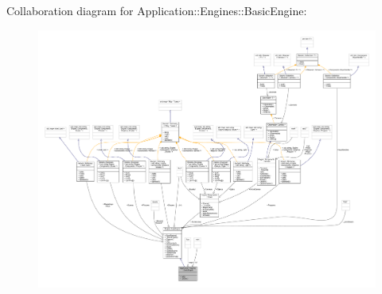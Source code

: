 Collaboration diagram for Application\+:\+:Engines\+:\+:Basic\+Engine\+:
\nopagebreak
\begin{figure}[H]
\begin{center}
\leavevmode
\includegraphics[width=350pt]{classApplication_1_1Engines_1_1BasicEngine__coll__graph}
\end{center}
\end{figure}
